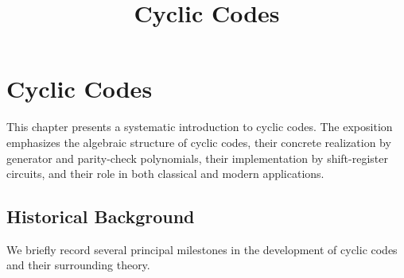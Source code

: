\documentclass[11pt,oneside]{book}
\title{Cyclic Codes}
\author{}
\date{}
\theoremstyle{plain}
\theoremstyle{definition}
\theoremstyle{remark}
\begin{document}
\frontmatter
\maketitle
\tableofcontents
\mainmatter


\chapter{Cyclic Codes}\label{chap:cyclic-codes}

This chapter presents a systematic introduction to cyclic codes. The exposition emphasizes the algebraic structure of cyclic codes, their concrete realization by generator and parity-check polynomials, their implementation by shift-register circuits, and their role in both classical and modern applications.



\section{Historical Background}\label{sec:historical-background}

We briefly record several principal milestones in the development of cyclic codes and their surrounding theory.
\end{document}
